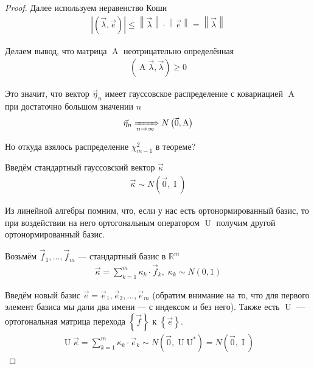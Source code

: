 \begin{proof}
  Далее используем неравенство Коши
  \begin{align*}
      \left| \left( \vec{\lambda}, \vec{e} \right) \right|
      \le \left\| \vec{\lambda} \right\| \cdot \left\| \vec{e} \right\|
      = \left\| \vec{\lambda} \right\|
  \end{align*}

  Делаем вывод, что матрица $\operatorname{A}$ неотрицательно определённая
  \begin{align*}
      \left( \operatorname{A} \vec{\lambda}, \vec{\lambda} \right) \ge 0
  \end{align*}

  Это значит, что вектор $\vec{\eta}_n$ имеет гауссовское распределение с
  ковариацией $\operatorname{A}$ при достаточно большом значении $n$
  \begin{align*}
      \vec{\eta}_n \xRightarrow[n\to\infty]{} N\left( \vec{0}, \operatorname{A} \right)
  \end{align*}

  Но откуда взялось распределение $\chi_{m-1}^2$ в теореме?

  Введём стандартный гауссовский вектор $\vec{\kappa}$
  \begin{align*}
      \vec{\kappa} \sim N\left( \vec{0}, \operatorname{I} \right)
  \end{align*}

  Из линейной алгебры помним, что, если у нас есть ортонормированный базис,
  то при воздействии на него ортогональным оператором $\operatorname{U}$
  получим другой ортонормированный базис.

  Возьмём $\vec{f}_1, \dots, \vec{f}_m$ --- стандартный базис в
  $\mathbb{R}^m$
  \begin{align*}
      \vec{\kappa} = \sum_{k=1}^{m} \kappa_k \cdot \vec{f}_k,\;
      \kappa_k \sim N\left( 0, 1 \right)
  \end{align*}

  Введём новый базис $\vec{e} = \vec{e}_1, \vec{e}_2, \dots, \vec{e}_m$
  (обратим внимание на то, что для первого элемент базиса мы дали два имени
  --- с индексом и без него). Также есть $\operatorname{U}$ --- ортогональная
  матрица перехода $\left\{ \vec{f} \right\}$ к $\left\{ \vec{e} \right\}$.
  \begin{align*}
      \operatorname{U} \vec{\kappa}
      = \sum_{k=1}^{m} \hat{\kappa}_k \cdot \vec{e}_k
      \sim N\left( \vec{0}, \operatorname{U} \operatorname{U^*} \right)
      = N\left( \vec{0}, \operatorname{I} \right)
  \end{align*}


\end{proof}
